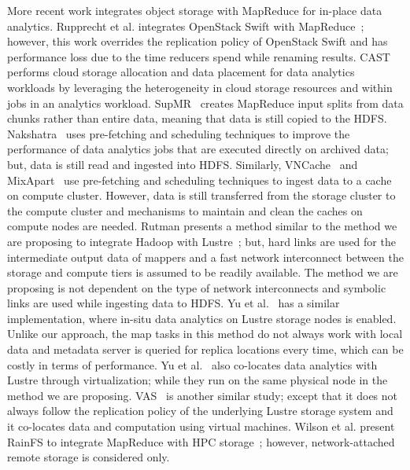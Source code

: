 \documentclass[preprint,12pt]{elsarticle}
\begin{document}

More recent work integrates object storage with MapReduce for in-place data analytics. Rupprecht et al.
integrates OpenStack Swift with MapReduce~\cite{rupprechtbd}; however, this work overrides the replication
policy of OpenStack Swift and has performance loss due to the time reducers spend while renaming results.
CAST~\cite{chengcast} performs cloud storage allocation and data placement for data
analytics workloads by leveraging the heterogeneity in cloud storage
resources and within jobs in an analytics workload. SupMR~\cite{supmr} creates MapReduce input splits from data chunks rather
than entire data, meaning that data is still copied to the HDFS. Nakshatra~\cite{nakshatra}
uses pre-fetching and scheduling techniques to improve the performance of data analytics jobs that are executed directly
on archived data; but, data is still read and ingested into HDFS. Similarly, VNCache~\cite{vncache} and MixApart~\cite{180733}
use pre-fetching and scheduling techniques to ingest data to a cache on compute cluster. However, data is still transferred from
the storage cluster to the compute cluster and mechanisms to maintain and clean the caches on compute nodes are needed.
Rutman presents a method similar to the method we are proposing to integrate Hadoop with Lustre~\cite{rutman}; but, hard
links are used for the intermediate output data of mappers and a fast network interconnect between the storage and
compute tiers is assumed to be readily available. The method we are proposing is not dependent on the type of network
interconnects and symbolic links are used while ingesting data to HDFS. Yu et al.~\cite{hadoopyarnprogress} has a similar
implementation, where in-situ data analytics on Lustre storage nodes is enabled. Unlike our approach, the map tasks in this
method do not always work with local data and metadata server is queried for replica locations every time, which can be
costly in terms of performance. Yu et al.~\cite{hadoopyarnprogress} also co-locates data analytics with Lustre through
virtualization; while they run on the same physical node in the method we are proposing. VAS~\cite{hadooplustre} is
another similar study; except that it does not always follow the replication policy of the underlying Lustre storage system
and it co-locates data and computation using virtual machines. Wilson et al. present RainFS to integrate MapReduce with HPC
storage~\cite{wilsonhadoop}; however, network-attached remote storage is considered only.
\end{document}
